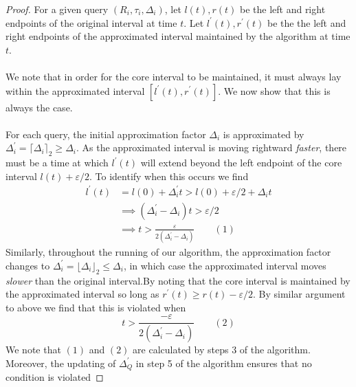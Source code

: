 \begin{proof}
    For a given query $(R_i, \tau_i, \Delta_i)$, let $l(t), r(t)$ be the left and right endpoints of the original interval at time $t$. Let  $l^\prime(t), r^\prime(t)$ be the the left and right endpoints of the approximated interval maintained by the algorithm at time $t$. \\
    \\
    We note that in order for the core interval to be maintained, it must always lay within the approximated interval $[l^\prime(t), r^\prime(t)]$. We now show that this is always the case. \\
    \\
    For each query, the initial approximation factor $\Delta_i$ is approximated by $\Delta_i^\prime = \lceil \Delta_i\rceil_2 \geq \Delta_i$. As the approximated interval is moving rightward \textit{faster}, there must be a time at which $l^\prime(t)$ will extend beyond the left endpoint of the core interval $l(t) + \varepsilon/2$. To identify when this occurs we find 
    \begin{align*}
        l^\prime(t) &= l(0) + \Delta_i^\prime t > l(0) + \varepsilon/2 + \Delta_i t \\
        &\implies (\Delta_i^\prime - \Delta_i) t > \varepsilon/2 \\
        & \implies t > \frac{\varepsilon}{2(\Delta_i^\prime - \Delta_i)} \quad\quad (1)
    \end{align*}
    Similarly, throughout the running of our algorithm, the approximation factor changes to $\Delta_i^\prime = \lfloor \Delta_i \rfloor_2 \leq \Delta_i$, in which case the approximated interval moves \textit{slower} than the original interval.By noting that the core interval is maintained by the approximated interval so long as $r^\prime(t)\geq r(t) - \varepsilon/2$. By similar argument to above we find that this is violated when 
    $$ t > \frac{-\varepsilon}{2(\Delta_i^\prime - \Delta_i)}  \quad\quad (2)$$
    We note that $(1)$ and $(2)$ are calculated by steps 3 of the algorithm. Moreover, the updating of $\Delta_Q^\prime$ in step 5 of the algorithm ensures that no condition is violated
\end{proof}

